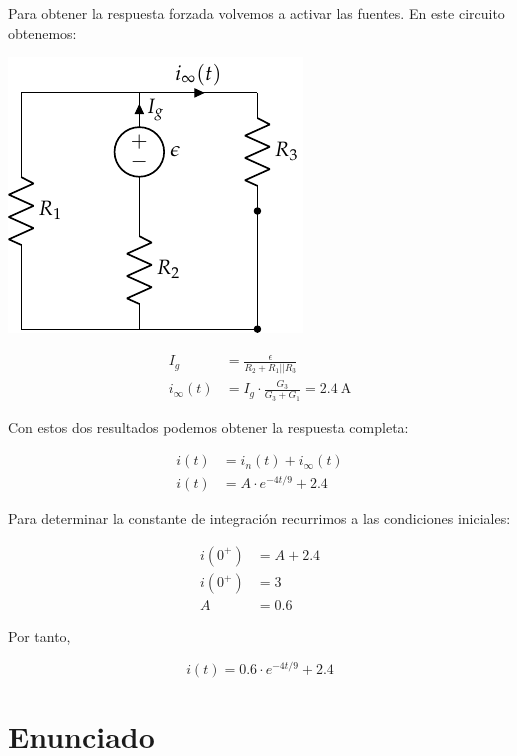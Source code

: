 Para obtener la respuesta forzada volvemos a activar las fuentes. En
este circuito obtenemos:

\begin{minipage}{0.3\textwidth}
  \includegraphics{figuras/FM_4_2_forzada}
\end{minipage}
\begin{minipage}{0.7\textwidth}
  \begin{align*}
    I_g &= \frac{\epsilon}{R_2 + R_1||R_3}\\
    i_\infty(t) &= I_g \cdot \frac{G_3}{G_3 + G_1} = \SI{2.4}{\ampere}
  \end{align*}
\end{minipage}

Con estos dos resultados podemos obtener la respuesta completa:

\begin{align*}
  i(t) &= i_n(t) + i_\infty(t)\\
  i(t) &= A \cdot e^{-4t/9} + 2.4
\end{align*}

Para determinar la constante de integración recurrimos a las
condiciones iniciales:

\begin{align*}
  i(0^+) &= A + 2.4\\
  i(0^+) &= 3\\
  A &= 0.6
\end{align*}

Por tanto,

\begin{equation*}
  i(t) = 0.6 \cdot e^{-4t/9} + 2.4
\end{equation*}

\section{Enunciado}

